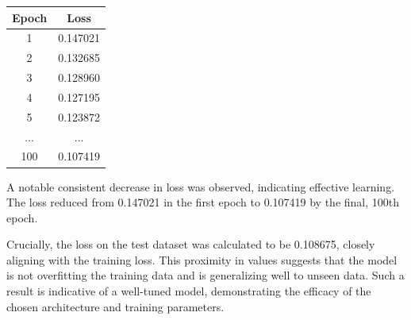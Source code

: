 \documentclass{article}
\begin{document}
\begin{center}
    \begin{tabular}{cc}
        \hline
        Epoch & Loss \\
        \hline
        1 & 0.147021 \\
        2 & 0.132685 \\
        3 & 0.128960 \\
        4 & 0.127195 \\
        5 & 0.123872 \\
        ... & ... \\
        100 & 0.107419 \\
        \hline
    \end{tabular}
\end{center}


A notable consistent decrease in loss was observed, indicating effective learning. The loss reduced from 0.147021 in the first epoch to 0.107419 by the final, 100th epoch. 

Crucially, the loss on the test dataset was calculated to be 0.108675, closely aligning with the training loss. This proximity in values suggests that the model is not overfitting the training data and is generalizing well to unseen data. Such a result is indicative of a well-tuned model, demonstrating the efficacy of the chosen architecture and training parameters.
\end{document}
